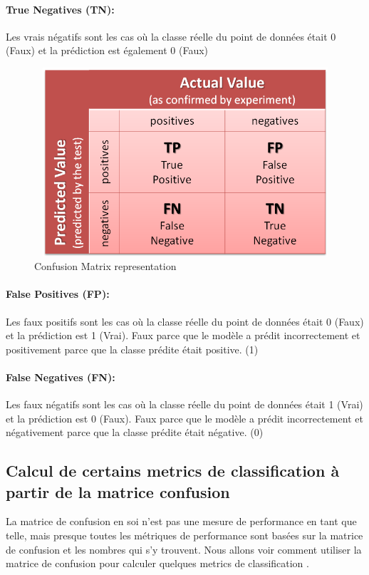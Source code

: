 \documentclass[12pt, french]{report}
\begin{document}
\paragraph*{True Negatives (TN):}
Les vrais négatifs sont les cas où la classe réelle du point de données était 0 (Faux) et la prédiction est également 0 (Faux)

\begin{figure}[h]
\includegraphics[width=14cm, height=7cm]{images/confusionmatrix.png}
\caption{Confusion Matrix representation \cite{key25}}
\label{confusionmatrix}
\end{figure}

\paragraph*{False Positives (FP):}
Les faux positifs sont les cas où la classe réelle du point de données était 0 (Faux) et la prédiction est 1 (Vrai). Faux parce que le modèle a prédit incorrectement et positivement parce que la classe prédite était positive. (1)
\paragraph*{False Negatives (FN):}
Les faux négatifs sont les cas où la classe réelle du point de données était 1 (Vrai) et la prédiction est 0 (Faux). Faux parce que le modèle a prédit incorrectement et négativement parce que la classe prédite était négative. (0)



\subsection{Calcul de certains metrics de classification à partir de la matrice confusion}

La matrice de confusion en soi n'est pas une mesure de performance en tant que telle, mais presque toutes les métriques de performance sont basées sur la matrice de confusion et les nombres qui s'y trouvent. Nous allons voir comment utiliser la matrice de confusion pour calculer quelques metrics de classification \cite{key17}.
\end{document}
